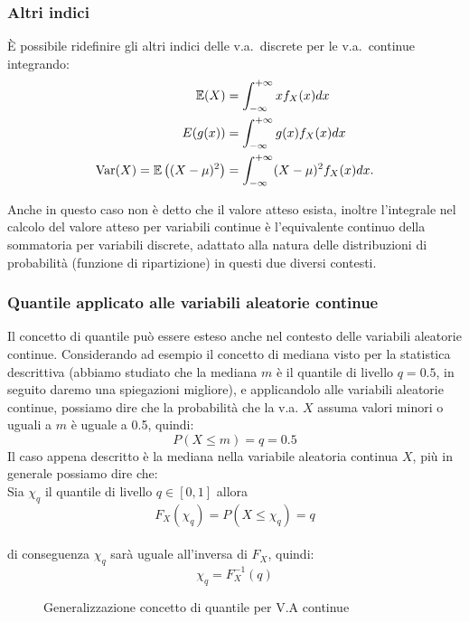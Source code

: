\subsubsection{Altri indici}
È possibile ridefinire gli altri indici delle v.a.\ discrete per le v.a.\ continue integrando: \begin{align*}
\mathbb{E}(X) &= \int_{-\infty}^{+\infty} x f_X(x) dx
\\
E(g(x)) &= \int_{-\infty}^{+\infty} g(x) f_X(x) dx \\
\operatorname{Var}(X) = \mathbb{E}\left((X-\mu)^2\right) &= \int_{-\infty}^{+\infty} (X-\mu)^2 f_X(x) dx.
\end{align*}

\noindent Anche in questo caso non è detto che il valore atteso esista, inoltre  l'integrale nel calcolo del valore atteso per variabili continue è l'equivalente continuo della sommatoria per variabili discrete, adattato alla natura delle distribuzioni di probabilità (funzione di ripartizione) in questi due diversi contesti.

\subsubsection{Quantile applicato alle variabili aleatorie continue}
Il concetto di quantile può essere esteso anche nel contesto delle variabili aleatorie continue. Considerando ad esempio il concetto di mediana visto per la statistica descrittiva (abbiamo studiato che la mediana $m$ è il quantile di livello $q = 0.5$, in seguito daremo una spiegazioni migliore), e applicandolo alle variabili aleatorie continue, possiamo dire che la probabilità che la v.a. $X$ assuma valori minori o uguali a $m$ è uguale a 0.5, quindi:
$$P (X \leq m) = q = 0.5$$
Il caso appena descritto è la mediana nella variabile aleatoria continua $X$, più in generale possiamo dire che: \\
Sia $\chi_q$ il quantile di livello $q \in [0, 1]$ allora \[ 
F_X(\chi_q) = P (X \leq \chi_q) = q
\] \\
di conseguenza $\chi_q$ sarà uguale all'inversa di $F_X$, quindi: \\
$$\chi_q = F_X^{-1}(q)$$

\begin{figure}[h!]
    \vspace{\abovedisplayskip} 
    \centering
{}
\caption{Generalizzazione concetto di quantile per V.A continue}
\label{fig:quantile_va}
\end{figure}

